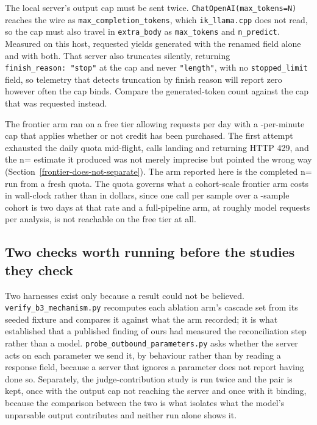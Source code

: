 The local server's output cap must be sent twice. \texttt{ChatOpenAI(max\_tokens=N)} reaches the wire
as \texttt{max\_completion\_tokens}, which \texttt{ik\_llama.cpp} does not read, so the cap must also
travel in \texttt{extra\_body} as \texttt{max\_tokens} and \texttt{n\_predict}. Measured on this
host,  requested yields  generated with the renamed
field alone and  with both. That server also truncates silently, returning
\texttt{finish\_reason:\ "stop"} at the cap and never \texttt{"length"}, with no
\texttt{stopped\_limit} field, so telemetry that detects truncation by finish reason will report zero
however often the cap binds. Compare the generated-token count against the cap that was requested
instead.

The frontier arm ran on a free tier allowing  requests per day with a
-per-minute cap that applies whether or not credit has been purchased.
The first attempt exhausted the daily quota mid-flight,  calls landing and
 returning HTTP 429, and the n= estimate it
produced was not merely imprecise but pointed the wrong way
(Section~\ref{frontier-does-not-separate}). The arm reported here is the completed
n= run from a fresh quota. The quota governs what a cohort-scale frontier arm
costs in wall-clock rather than in dollars, since one call per sample over a -sample
cohort is two days at that rate and a full-pipeline arm, at roughly 
model requests per analysis, is not reachable on the free tier at all.

\subsection{Two checks worth running before the studies they check}\label{reproducing-each-result}

Two harnesses exist only because a result could not be believed.
\texttt{verify\_b3\_mechanism.py} recomputes each ablation arm's cascade set from its seeded fixture
and compares it against what the arm recorded; it is what established that a published finding of
ours had measured the reconciliation step rather than a model.
\texttt{probe\_outbound\_parameters.py} asks whether the server acts on each parameter we send it, by
behaviour rather than by reading a response field, because a server that ignores a parameter does not
report having done so. Separately, the judge-contribution study is run twice and the pair is kept,
once with the output cap not reaching the server and once with it binding, because the comparison
between the two is what isolates what the model's unparsable output contributes and neither run alone
shows it.

